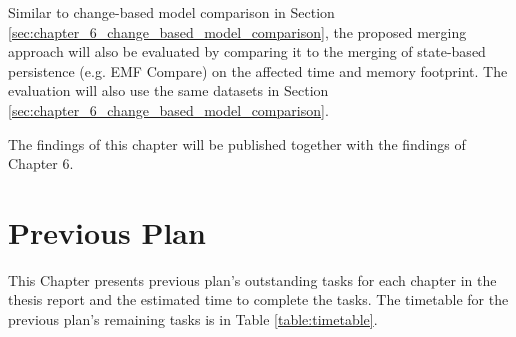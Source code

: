 \documentclass[12pt, a4paper]{report} \usepackage[titletoc]{appendix}
\begin{document}
Similar to change-based model comparison in Section \ref{sec:chapter_6_change_based_model_comparison}, the proposed merging approach will also be evaluated by comparing it to the merging of state-based persistence (e.g. EMF Compare) on the affected time and memory footprint. The evaluation will also use the same datasets in Section \ref{sec:chapter_6_change_based_model_comparison}.

The findings of this chapter will be published together with the findings of Chapter 6.

\chapter{Previous Plan}
\label{ch:plan}
This Chapter presents previous plan's outstanding tasks for each chapter in the thesis report and the estimated time to complete the tasks. The timetable for the previous plan's remaining tasks is in Table \ref{table:timetable}.
\end{document}
